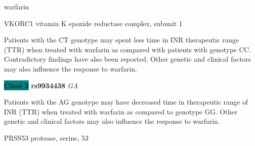 \documentclass{resume} %
\begin{document}
\begin{rSection}{ warfarin }
\begin{rSubsection}{ VKORC1 }{ vitamin K epoxide reductase complex, subunit 1 }{}{}
\item[] Patients with the CT genotype may spent less time in INR therapeutic range (TTR) when treated with warfarin as compared with patients with genotype CC. Contradictory findings have also been reported. Other genetic and clinical factors may also influence the response to warfarin.\item \textbf{\colorbox{teal} {Class 3}} \textbf{ rs9934438 } \textit{ GA }
\item[] Patients with the AG genotype may have decreased time in therapeutic range of INR (TTR) when treated with warfarin as compared to genotype GG. Other genetic and clinical factors may also influence the response to warfarin.
\end{rSubsection}\begin{rSubsection}{ PRSS53 }{ protease, serine, 53 }{}{}
\item[]


\end{rSubsection}
\end{rSection}
\end{document}
